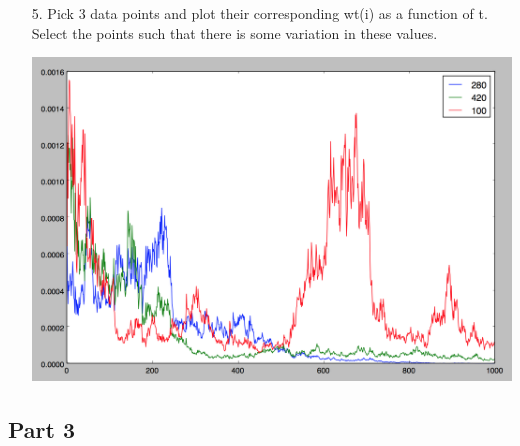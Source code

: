\documentclass[11pt]{article}
\begin{document}
\begin{enumerate}
\item[5.] Pick 3 data points and plot their corresponding wt(i) as a function of t. Select the points such that there is some variation in these values.

\includegraphics[scale=.5]{images/p2w.png}

\end{enumerate}

\subsection*{Part 3}
\end{document}
